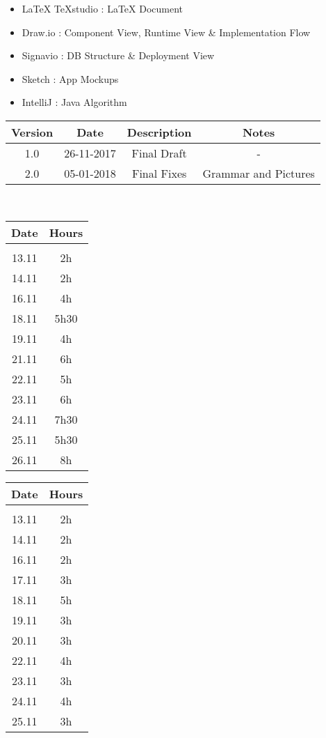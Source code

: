 \begin{itemize}
	\setlength{\leftskip}{1cm}
	\item LaTeX TeXstudio : LaTeX Document
	\item Draw.io : Component View, Runtime View \& Implementation Flow
	\item Signavio : DB Structure \& Deployment View
	\item Sketch : App Mockups
	\item IntelliJ : Java Algorithm
\end{itemize}

\vspace{0.5cm}
\begin{tabular}[H]{c|c|c|c}
	Version & Date & Description & Notes\\
	\hline
	\rule{0pt}{4ex}1.0	&	26-11-2017	&	Final Draft	&	-\\
	\rule{0pt}{4ex}2.0	&	05-01-2018	&	Final Fixes	&	Grammar and Pictures
\end{tabular}
\vspace{0.5cm}\\

\vspace{0.5cm}
\begin{tabular}[H]{c|c}
	Date & Hours\\
	\hline\\
	13.11	&	2h\\
	14.11	&	2h\\
	16.11	&	4h\\
	18.11	&	5h30\\
	19.11	&	4h\\
	21.11	&	6h\\
	22.11	&	5h\\
	23.11	&	6h\\
	24.11	&	7h30\\
	25.11	&	5h30\\
	26.11	&	8h
\end{tabular}

\vspace{0.5cm}
\begin{tabular}[H]{c|c}
	Date & Hours\\
	\hline\\
	13.11	&	2h\\
	14.11	&	2h\\
	16.11	&	2h\\
	17.11	&	3h\\
	18.11	&	5h\\
	19.11	&	3h\\
	20.11	&	3h\\
	22.11	&	4h\\
	23.11	&	3h\\
	24.11	&	4h\\
	25.11	&	3h
\end{tabular}

